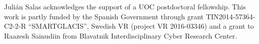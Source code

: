\begin{acknowledgements}
Juli\'{a}n Salas acknowledges the support of a UOC postdoctoral fellowship.
This work is partly funded by the Spanish Government through grant TIN2014-57364-C2-2-R ``SMARTGLACIS'', Swedish VR (project VR 2016-03346) and a grant to Raazesh Sainudiin from Blavatnik Interdisciplinary Cyber Research Center.
\end{acknowledgements}




%
%
%
%






